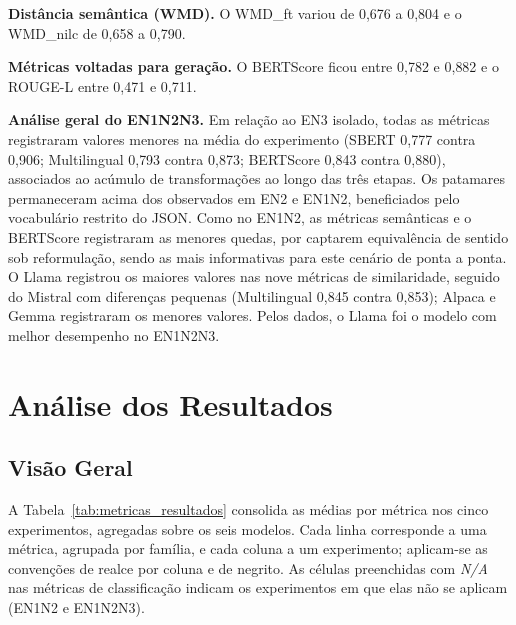 \textbf{Distância semântica (WMD).} O WMD\_ft variou de 0{,}676 a 0{,}804 e o WMD\_nilc de 0{,}658 a 0{,}790.

\textbf{Métricas voltadas para geração.} O BERTScore ficou entre 0{,}782 e 0{,}882 e o ROUGE-L entre 0{,}471 e 0{,}711.

\textbf{Análise geral do EN1N2N3.} Em relação ao EN3 isolado, todas as métricas registraram valores menores na média do experimento (SBERT 0{,}777 contra 0{,}906; Multilingual 0{,}793 contra 0{,}873; BERTScore 0{,}843 contra 0{,}880), associados ao acúmulo de transformações ao longo das três etapas. Os patamares permaneceram acima dos observados em EN2 e EN1N2, beneficiados pelo vocabulário restrito do JSON. Como no EN1N2, as métricas semânticas e o BERTScore registraram as menores quedas, por captarem equivalência de sentido sob reformulação, sendo as mais informativas para este cenário de ponta a ponta. O Llama registrou os maiores valores nas nove métricas de similaridade, seguido do Mistral com diferenças pequenas (Multilingual 0{,}845 contra 0{,}853); Alpaca e Gemma registraram os menores valores. Pelos dados, o Llama foi o modelo com melhor desempenho no EN1N2N3.

\section{Análise dos Resultados}
\label{sec:analise_resultados}

\subsection{Visão Geral}

A Tabela~\ref{tab:metricas_resultados} consolida as médias por métrica nos cinco experimentos, agregadas sobre os seis modelos. Cada linha corresponde a uma métrica, agrupada por família, e cada coluna a um experimento; aplicam-se as convenções de realce por coluna e de negrito. As células preenchidas com \textit{N/A} nas métricas de classificação indicam os experimentos em que elas não se aplicam (EN1N2 e EN1N2N3).

